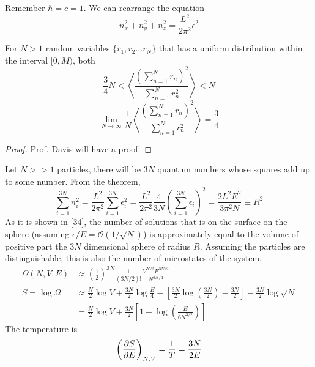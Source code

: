 \documentclass{article}
\begin{document}
\begin{sol}[1.7]
    Remember $\hbar=c=1$. We can rearrange the equation
    \begin{equation}
        n_x^2+n_y^2+n_z^2=\frac{L^2}{2\pi^2}\epsilon^2
    \end{equation}
    \begin{theorem}
        For $N>1$ random variables $\{r_1,r_2\dots r_N\}$ that has a uniform distribution within the interval $[0,M)$, both
        \begin{equation}
            \frac{3}{4}N<\left\langle\frac{(\sum_{n=1}^Nr_n)^2}{\sum_{n=1}^Nr_n^2}\right\rangle<N
        \end{equation}
        \begin{equation}
            \lim_{N\to\infty}\frac{1}{N}\left\langle\frac{(\sum_{n=1}^Nr_n)^2}{\sum_{n=1}^Nr_n^2}\right\rangle=\frac{3}{4}
        \end{equation}
    \end{theorem}
    \begin{proof}
        Prof. Davis will have a proof.
    \end{proof}
    Let $N>>1$ particles, there will be $3N$ quantum numbers whose squares add up to some number. From the theorem, 
    \begin{equation}
        \sum_{i=1}^{3N}n_i^2=\frac{L^2}{2\pi^2}\sum_{i=1}^{3N}\epsilon_i^2=\frac{L^2}{2\pi^2}\frac{4}{3N}\left(\sum_{i=1}^{3N}\epsilon_i\right)^2=\frac{2L^2E^2}{3\pi^2N}\equiv R^2
    \end{equation}
    As it is shown in \eqref{34}, the number of solutions that is on the surface on the sphere (assuming $\epsilon/E=\mathcal{O}(1/\sqrt{N})$) is approximately equal to the volume of positive part the $3N$ dimensional sphere of radius $R$. Assuming the particles are distinguishable, this is also the number of microstates of the system.
    \begin{align}
        \Omega(N,V,E)&\approx \left(\frac{1}{2}\right)^{3N}\frac{1}{(3N/2)!}\frac{V^{N/2}E^{3N/2}}{N^{3N/4}}\\
        S=\log \Omega&\approx \frac{N}{2}\log V+\frac{3N}{2}\log\frac{E}{4}-\left[\frac{3N}{2}\log\left(\frac{3N}{2}\right)-\frac{3N}{2}\right]-\frac{3N}{2}\log \sqrt N\\
        &=\frac{N}{2}\log V+\frac{3N}{2}\left[1+\log\left(\frac{E}{6N^{3/2}}\right)\right]
    \end{align}
    The temperature is
    \begin{equation}
        \left(\partialderivative{S}{E}\right)_{N,V}=\frac{1}{T}=\frac{3N}{2E}

\end{equation}
\end{sol}
\end{document}
